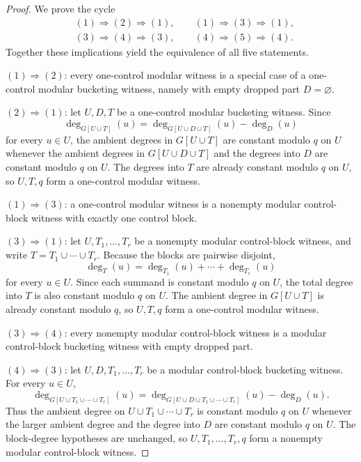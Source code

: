 \documentclass[11pt]{amsart}
\theoremstyle{definition}
\begin{document}
\begin{proof}
We prove the cycle
\begin{align*}
  &(1) \Rightarrow (2) \Rightarrow (1), \qquad
    (1) \Rightarrow (3) \Rightarrow (1), \\
  &(3) \Rightarrow (4) \Rightarrow (3), \qquad
    (4) \Rightarrow (5) \Rightarrow (4).
\end{align*}
Together these implications yield the equivalence of all five statements.

\smallskip

\noindent
$(1)\Rightarrow(2)$: every one-control modular witness is a special case of a one-control modular
bucketing witness, namely with empty dropped part $D=\varnothing$.

\smallskip

\noindent
$(2)\Rightarrow(1)$: let $U,D,T$ be a one-control modular bucketing witness. Since
\[
  \deg_{G[U \cup T]}(u)=\deg_{G[U \cup D \cup T]}(u)-\deg_D(u)
\]
for every $u \in U$, the ambient degrees in $G[U \cup T]$ are constant modulo $q$ on $U$ whenever
the ambient degrees in $G[U \cup D \cup T]$ and the degrees into $D$ are constant modulo $q$ on
$U$. The degrees into $T$ are already constant modulo $q$ on $U$, so $U,T,q$ form a one-control
modular witness.

\smallskip

\noindent
$(1)\Rightarrow(3)$: a one-control modular witness is a nonempty modular control-block witness with
exactly one control block.

\smallskip

\noindent
$(3)\Rightarrow(1)$: let $U,T_1,\dots,T_r$ be a nonempty modular control-block witness, and write
$T=T_1 \cup \cdots \cup T_r$. Because the blocks are pairwise disjoint,
\[
  \deg_T(u)=\deg_{T_1}(u)+\cdots+\deg_{T_r}(u)
\]
for every $u \in U$. Since each summand is constant modulo $q$ on $U$, the total degree into $T$ is
also constant modulo $q$ on $U$. The ambient degree in $G[U \cup T]$ is already constant modulo
$q$, so $U,T,q$ form a one-control modular witness.

\smallskip

\noindent
$(3)\Rightarrow(4)$: every nonempty modular control-block witness is a modular control-block
bucketing witness with empty dropped part.

\smallskip

\noindent
$(4)\Rightarrow(3)$: let $U,D,T_1,\dots,T_r$ be a modular control-block bucketing witness. For every
$u \in U$,
\[
  \deg_{G[U \cup T_1 \cup \cdots \cup T_r]}(u)
  =
  \deg_{G[U \cup D \cup T_1 \cup \cdots \cup T_r]}(u)-\deg_D(u).
\]
Thus the ambient degree on $U \cup T_1 \cup \cdots \cup T_r$ is constant modulo $q$ on $U$ whenever
the larger ambient degree and the degree into $D$ are constant modulo $q$ on $U$. The block-degree
hypotheses are unchanged, so $U,T_1,\dots,T_r,q$ form a nonempty modular control-block witness.


\end{proof}
\end{document}
